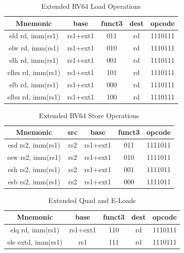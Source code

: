 \documentclass{article}
\begin{document}
\begin{center}
\begin{small}

\begin{table}[H]
\caption{Extended RV64 Load Operations}
\begin{center}
\begin{tabular}{| c | c | c | c | c | }
\hline
Mnemonic & base & funct3 & dest & opcode \\ \hline
\hline
eld rd, imm(rs1) & rs1+ext1 & 011 & rd & 1110111\\
\hline
elw rd, imm(rs1) & rs1+ext1 & 010 & rd & 1110111\\
\hline
elh rd, imm(rs1) & rs1+ext1 & 001 & rd & 1110111\\
\hline
elhu rd, imm(rs1) & rs1+ext1 & 101 & rd & 1110111\\
\hline
elb rd, imm(rs1) & rs1+ext1 & 000 & rd & 1110111\\
\hline
elbu rd, imm(rs1) & rs1+ext1 & 100 & rd & 1110111\\
\hline
\end{tabular}
\end{center}
\end{table}

\begin{table}[H]
\caption{Extended RV64 Store Operations}
\begin{center}
\begin{tabular}{| c | c | c | c | c | }
\hline
Mnemonic & src & base & funct3 & opcode \\ \hline
\hline
esd rs2, imm(rs1) & rs2 & rs1+ext1 & 011 & 1111011\\
\hline
esw rs2, imm(rs1) & rs2 & rs1+ext1 & 010 & 1111011\\
\hline
esh rs2, imm(rs1) & rs2 & rs1+ext1 & 001 & 1111011\\
\hline
esb rs2, imm(rs1) & rs2 & rs1+ext1 & 000 & 1111011\\
\hline
\end{tabular}
\end{center}
\end{table}

\begin{table}[H]
\caption{Extended Quad and E-Loads}
\begin{center}
\begin{tabular}{| c | c | c | c | c | }
\hline
Mnemonic & base & funct3 & dest & opcode \\ \hline
\hline
elq rd, imm(rs1) & rs1+ext1 & 110 & rd & 1110111\\
\hline
ele extd, imm(rs1) & rs1 & 111 & rd & 1110111\\
\hline
\end{tabular}
\end{center}
\end{table}


\end{small}
\end{center}
\end{document}
